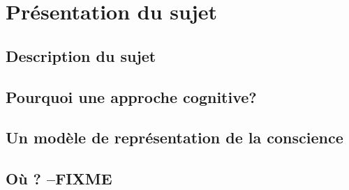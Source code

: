 \part{Présentation du sujet}

\clearemptydoublepage
\chapter{Description du sujet} 


\clearemptydoublepage
\chapter{Pourquoi une approche cognitive?} 


\clearemptydoublepage
\chapter{Un modèle de représentation de la conscience}


\clearemptydoublepage
\chapter{Où ? --FIXME}
